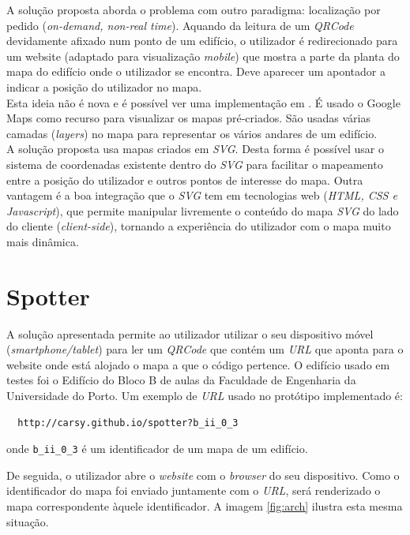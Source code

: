 \documentclass[twocolumn,twoside,11pt]{article}
\newcommand{\svg}{\emph{SVG}}
\newcommand{\qrcode}{\emph{QRCode}}
\begin{document}
  A solução proposta aborda o problema com outro paradigma: localização por pedido (\emph{on-demand, non-real time}).
  Aquando da leitura de um \qrcode{} \cite{Wkhlu2008} devidamente afixado num ponto de um edifício, o utilizador é redirecionado para um website (adaptado para visualização \emph{mobile}) que mostra a parte da planta do mapa do edifício onde o utilizador se encontra.
  Deve aparecer um apontador a indicar a posição do utilizador no mapa.
  \\
  Esta ideia não é nova e é possível ver uma implementação em \cite{Costa2011}.
  É usado o Google Maps como recurso para visualizar os mapas pré-criados.
  São usadas várias camadas (\emph{layers}) no mapa para representar os vários andares de um edifício.
  \\

  A solução proposta usa mapas criados em \svg.
  Desta forma é possível usar o sistema de coordenadas existente dentro do \svg{} para facilitar o mapeamento entre a posição do utilizador e outros pontos de interesse do mapa.
  Outra vantagem é a boa integração que o \svg{} tem em tecnologias web (\emph{HTML, CSS e Javascript}), que permite manipular livremente o conteúdo do mapa \svg{} do lado do cliente (\emph{client-side}), tornando a experiência do utilizador com o mapa muito mais dinâmica.



\section{Spotter} %
\label{sec:solucao}

  A solução apresentada permite ao utilizador utilizar o seu dispositivo móvel (\emph{smartphone/tablet}) para ler um \qrcode{} que contém um \emph{URL} que aponta para o website onde está alojado o mapa a que o código pertence.
  O edifício usado em testes foi o Edifício do Bloco B de aulas da Faculdade de Engenharia da Universidade do Porto.
  Um exemplo de \emph{URL} usado no protótipo implementado é:

  \begin{verbatim}
  http://carsy.github.io/spotter?b_ii_0_3\end{verbatim}
  onde \verb+b_ii_0_3+ é um identificador de um mapa de um edifício.

  De seguida, o utilizador abre o \emph{website} com o \emph{browser} do seu dispositivo.
  Como o identificador do mapa foi enviado juntamente com o \emph{URL}, será renderizado o mapa correspondente àquele identificador. 
  A imagem \ref{fig:arch} ilustra esta mesma situação.
\end{document}
